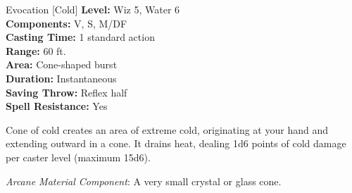 {Evocation [Cold]}
{
	\textbf{Level:}
	Wiz 5, Water 6\\
	\textbf{Components:}
	V, S, M/DF\\
	\textbf{Casting Time:}
	1 standard action\\
	\textbf{Range:}
	60 ft.\\
	\textbf{Area:}
	Cone-shaped burst\\
	\textbf{Duration:}
	Instantaneous\\
	\textbf{Saving Throw:}
	Reflex half\\
	\textbf{Spell Resistance:}
	Yes\\
}
{
	Cone of cold creates an area of extreme cold, originating at your hand and extending outward in a cone. It drains heat, dealing 1d6 points of cold damage per caster level (maximum 15d6).

	\textit{Arcane Material Component}:
	A very small crystal or glass cone.

}
